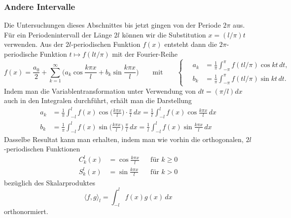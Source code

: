 \subsubsection{Andere Intervalle}
Die Untersuchungen dieses Abschnittes bis jetzt gingen von der 
Periode $2\pi$ aus.
Für ein Periodenintervall der Länge $2l$ können wir die Substitution
$x=(l/\pi)t$ verwenden.
Aus der $2l$-periodischen Funktion $f(x)$ entsteht dann die $2\pi$-periodische
Funktion $t\mapsto f(lt/\pi)$ mit der Fourier-Reihe
\[
f(x)
=
\frac{a_0}{2}
+
\sum_{k=1}^\infty
\biggl(a_k\cos\frac{k\pi x}{l} + b_k\sin\frac{k\pi x}{l}\biggr)
\qquad\text{mit}\qquad
\left\{\quad
\begin{aligned}
a_k
&=
\frac{1}{\pi}
\int_{-\pi}^\pi f(tl/\pi)\cos kt\,dt,
\\
b_k
&=
\frac{1}{\pi}
\int_{-\pi}^\pi f(tl/\pi)\sin kt\,dt.
\end{aligned}
\right.
\]
Indem man die Variablentransformation unter Verwendung von
$dt = (\pi/l)dx$ auch in den Integralen durchführt,
erhält man die Darstellung
\begin{align*}
a_k
&=
\frac{1}{\pi}\int_{-l}^l f(x)\cos\biggl(\frac{k\pi x}l\biggr)\cdot\frac{\pi}{l}\,dx
=
\frac{1}{l}\int_{-l}^l f(x) \cos\frac{k\pi x}{l} \,dx
\\
b_k
&=
\frac{1}{\pi}\int_{-l}^l f(x)\sin\biggl(\frac{k\pi x}l\biggr)\,\frac{\pi}{l}\,dx
=
\frac{1}{l}\int_{-l}^l f(x) \sin\frac{k\pi x}{l} \,dx
\end{align*}
Dasselbe Resultat kann man erhalten, indem man wie vorhin die
orthogonalen, $2l$-periodischen Funktionen
\[
\begin{aligned}
C^{l}_k(x) &= \cos\frac{k\pi x}{l} &&\text{für $k\ge 0$}
\\
S^{l}_k(x) &= \sin\frac{k\pi x}{l} &&\text{für $k>0$}
\end{aligned}
\]
bezüglich des Skalarproduktes
\[
\langle f,g\rangle_l
=
\int_{-l}^l f(x)g(x)\,dx
\]
orthonormiert.

%
%
